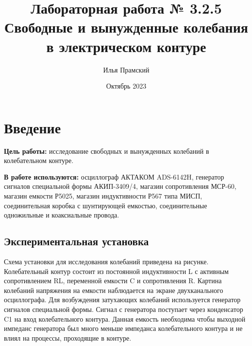 \documentclass[a4paper,12pt]{article}
\title{Лабораторная работа № 3.2.5\\Свободные и вынужденные колебания в электрическом контуре}
\author{Илья Прамский}
\date{Октябрь 2023}
\begin{document}
\maketitle
\newpage
\section*{Введение}
\textbf{Цель работы:} исследование свободных и вынужденных колебаний в
колебательном контуре.

\textbf{В работе используются:} осциллограф АКТАКОМ ADS-6142H, генератор сигналов специальной формы АКИП-3409/4, магазин сопротивления МСР-60, магазин емкости Р5025, магазин индуктивности Р567 типа МИСП, соединительная коробка с шунтирующей емкостью, соединительные одножильные и коаксиальные провода.

\subsection*{Экспериментальная установка}

Схема установки для исследования колебаний приведена на рисунке.
Колебательный контур состоит из постоянной индуктивности L с активным сопротивлением RL, переменной емкости C и сопротивления R. Картина колебаний
напряжения на емкости наблюдается на экране двухканального осциллографа. Для возбуждения затухающих колебаний используется генератор сигналов специальной
формы. Сигнал с генератора поступает через конденсатор C1 на вход колебательного контура. Данная емкость необходима чтобы выходной импеданс генератора был
много меньше импеданса колебательного контура и не влиял на процессы, проходящие в контуре.
\end{document}
